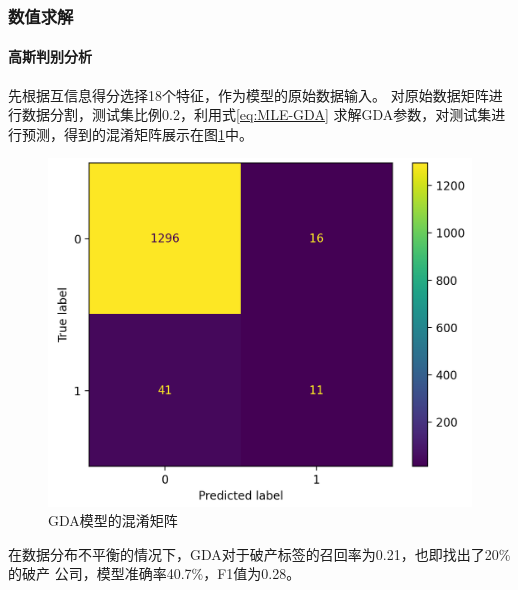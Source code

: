 
\subsubsection{数值求解}
\paragraph{高斯判别分析}
先根据互信息得分选择18个特征，作为模型的原始数据输入。
对原始数据矩阵进行数据分割，测试集比例0.2，利用式\ref{eq:MLE-GDA}
求解GDA参数，对测试集进行预测，得到的混淆矩阵展示在图\ref{fig:confusion-matrix-GDA}中。
\begin{figure}[ht]
    \centering
    \includegraphics[width=.6\textwidth]{images/confusion_matrix_GDA.png}
    \caption{GDA模型的混淆矩阵}
    \label{fig:confusion-matrix-GDA}
\end{figure}
在数据分布不平衡的情况下，GDA对于破产标签的召回率为0.21，也即找出了20\%的破产
公司，模型准确率40.7\%，F1值为0.28。

